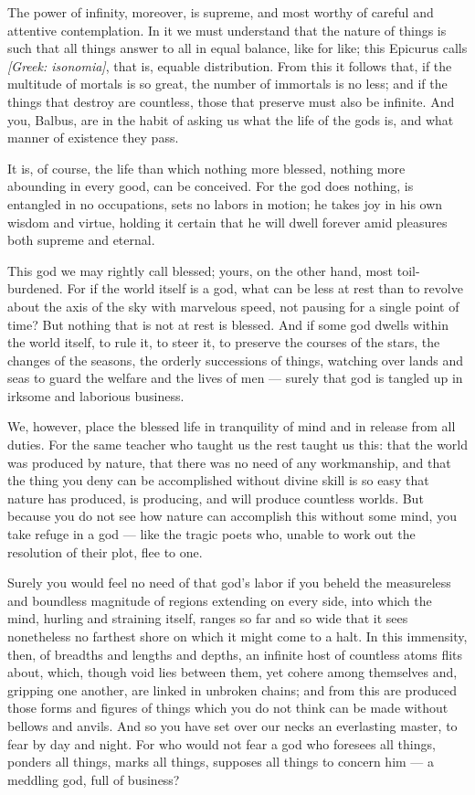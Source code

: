  The power of infinity, moreover, is supreme, and most worthy of careful and attentive contemplation. In it we must understand that the nature of things is such that all things answer to all in equal balance, like for like; this Epicurus calls \textit{[Greek: isonomia]}, that is, equable distribution. From this it follows that, if the multitude of mortals is so great, the number of immortals is no less; and if the things that destroy are countless, those that preserve must also be infinite. And you, Balbus, are in the habit of asking us what the life of the gods is, and what manner of existence they pass.

 It is, of course, the life than which nothing more blessed, nothing more abounding in every good, can be conceived. For the god does nothing, is entangled in no occupations, sets no labors in motion; he takes joy in his own wisdom and virtue, holding it certain that he will dwell forever amid pleasures both supreme and eternal.

 This god we may rightly call blessed; yours, on the other hand, most toil-burdened. For if the world itself is a god, what can be less at rest than to revolve about the axis of the sky with marvelous speed, not pausing for a single point of time? But nothing that is not at rest is blessed. And if some god dwells within the world itself, to rule it, to steer it, to preserve the courses of the stars, the changes of the seasons, the orderly successions of things, watching over lands and seas to guard the welfare and the lives of men — surely that god is tangled up in irksome and laborious business.

 We, however, place the blessed life in tranquility of mind and in release from all duties. For the same teacher who taught us the rest taught us this: that the world was produced by nature, that there was no need of any workmanship, and that the thing you deny can be accomplished without divine skill is so easy that nature has produced, is producing, and will produce countless worlds. But because you do not see how nature can accomplish this without some mind, you take refuge in a god — like the tragic poets who, unable to work out the resolution of their plot, flee to one.

 Surely you would feel no need of that god's labor if you beheld the measureless and boundless magnitude of regions extending on every side, into which the mind, hurling and straining itself, ranges so far and so wide that it sees nonetheless no farthest shore on which it might come to a halt. In this immensity, then, of breadths and lengths and depths, an infinite host of countless atoms flits about, which, though void lies between them, yet cohere among themselves and, gripping one another, are linked in unbroken chains; and from this are produced those forms and figures of things which you do not think can be made without bellows and anvils. And so you have set over our necks an everlasting master, to fear by day and night. For who would not fear a god who foresees all things, ponders all things, marks all things, supposes all things to concern him — a meddling god, full of business?


